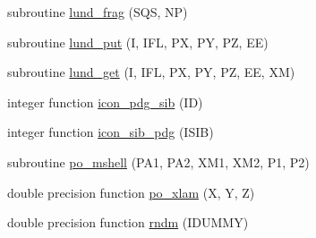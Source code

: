 \begin{DoxyCompactItemize}
subroutine \hyperlink{sophia_8f_aa2514852059ffefd5e81067e0416b369}{lund\+\_\+frag} (S\+Q\+S, N\+P)
\item 
subroutine \hyperlink{sophia_8f_a0d3735098c482b58d34ec7c94184d48c}{lund\+\_\+put} (I, I\+F\+L, P\+X, P\+Y, P\+Z, E\+E)
\item 
subroutine \hyperlink{sophia_8f_a60e0415dfc0daee02345071f23c94998}{lund\+\_\+get} (I, I\+F\+L, P\+X, P\+Y, P\+Z, E\+E, X\+M)
\item 
integer function \hyperlink{sophia_8f_a3928d8a7bc2ce08d3775703b5831b357}{icon\+\_\+pdg\+\_\+sib} (I\+D)
\item 
integer function \hyperlink{sophia_8f_a7f231f6a007b991d5bd222def346230a}{icon\+\_\+sib\+\_\+pdg} (I\+S\+I\+B)
\item 
subroutine \hyperlink{sophia_8f_ad5081f8ab8f8bcc8b16cd0d624b89eb9}{po\+\_\+mshell} (P\+A1, P\+A2, X\+M1, X\+M2, P1, P2)
\item 
double precision function \hyperlink{sophia_8f_ad9860632b53c4102f75afb65ab08ce14}{po\+\_\+xlam} (X, Y, Z)
\item 
double precision function \hyperlink{sophia_8f_aed998ddeef674b380ab46e12a16db0bc}{rndm} (I\+D\+U\+M\+M\+Y)
\end{DoxyCompactItemize}


